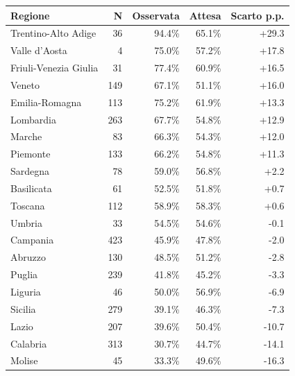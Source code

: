 \begin{tabular}{lrrrr}
\toprule
Regione & N & Osservata & Attesa & Scarto p.p. \\
\midrule
Trentino-Alto Adige & 36 & 94.4\% & 65.1\% & +29.3 \\
Valle d'Aosta & 4 & 75.0\% & 57.2\% & +17.8 \\
Friuli-Venezia Giulia & 31 & 77.4\% & 60.9\% & +16.5 \\
Veneto & 149 & 67.1\% & 51.1\% & +16.0 \\
Emilia-Romagna & 113 & 75.2\% & 61.9\% & +13.3 \\
Lombardia & 263 & 67.7\% & 54.8\% & +12.9 \\
Marche & 83 & 66.3\% & 54.3\% & +12.0 \\
Piemonte & 133 & 66.2\% & 54.8\% & +11.3 \\
Sardegna & 78 & 59.0\% & 56.8\% & +2.2 \\
Basilicata & 61 & 52.5\% & 51.8\% & +0.7 \\
Toscana & 112 & 58.9\% & 58.3\% & +0.6 \\
Umbria & 33 & 54.5\% & 54.6\% & -0.1 \\
Campania & 423 & 45.9\% & 47.8\% & -2.0 \\
Abruzzo & 130 & 48.5\% & 51.2\% & -2.8 \\
Puglia & 239 & 41.8\% & 45.2\% & -3.3 \\
Liguria & 46 & 50.0\% & 56.9\% & -6.9 \\
Sicilia & 279 & 39.1\% & 46.3\% & -7.3 \\
Lazio & 207 & 39.6\% & 50.4\% & -10.7 \\
Calabria & 313 & 30.7\% & 44.7\% & -14.1 \\
Molise & 45 & 33.3\% & 49.6\% & -16.3 \\
\bottomrule
\end{tabular}
